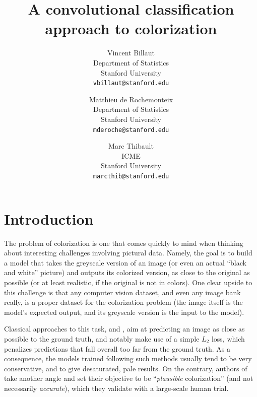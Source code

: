 \documentclass[10pt,twocolumn,letterpaper]{article}
\begin{document}
\title{A convolutional classification approach to colorization}

\author{Vincent Billaut\\
Department of Statistics\\
Stanford University\\
{\tt\small vbillaut@stanford.edu}
\and
Matthieu de Rochemonteix\\
Department of Statistics\\
Stanford University\\
{\tt\small mderoche@stanford.edu}
\and
Marc Thibault\\
ICME\\
Stanford University\\
{\tt\small marcthib@stanford.edu}
}

\maketitle



%

\section{Introduction}

The problem of colorization is one that comes quickly to mind when thinking about interesting challenges involving pictural data. Namely, the goal is to build a model that takes the greyscale version of an image (or even an actual ``black and white'' picture) and outputs its colorized version, as close to the original as possible (or at least realistic, if the original is not in colors).
One clear upside to this challenge is that any computer vision dataset, and even any image bank really, is a proper dataset for the colorization problem (the image itself is the model's expected output, and its greyscale version is the input to the model).

Classical approaches to this task, \eg \cite{cheng2015deep} and \cite{dahl2016tinyclouds}, aim at predicting an image as close as possible to the ground truth, and notably make use of a simple $L_2$ loss, which penalizes predictions that fall overall too far from the ground truth. As a consequence, the models trained following such methods usually tend to be very conservative, and to give desaturated, pale results.
On the contrary, authors of \cite{zhang2016colorful} take another angle and set their objective to be ``\textit{plausible} colorization'' (and not necessarily \textit{accurate}), which they validate with a large-scale human trial.
\end{document}
